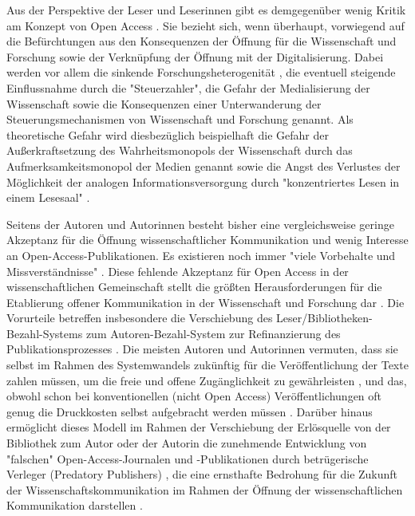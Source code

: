 Aus der Perspektive der Leser und Leserinnen gibt es demgegenüber wenig Kritik am Konzept von Open Access \cite{wein_2010_erwerbung} \cite{weishaupt_2009_goldenOA}. Sie bezieht sich, wenn überhaupt, vorwiegend auf die Befürchtungen aus den Konsequenzen der Öffnung für die Wissenschaft und Forschung sowie der Verknüpfung der Öffnung mit der Digitalisierung. Dabei werden vor allem die sinkende Forschungsheterogenität \cite{Hirschi_2015_buch_oa}, die eventuell steigende Einflussnahme durch die "Steuerzahler", die Gefahr der Medialisierung der Wissenschaft \cite{weingart_2005_wissenschaft} sowie die Konsequenzen einer Unterwanderung der Steuerungsmechanismen von Wissenschaft und Forschung genannt. Als theoretische Gefahr wird diesbezüglich beispielhaft die Gefahr der Außerkraftsetzung des Wahrheitsmonopols der Wissenschaft durch das Aufmerksamkeitsmonopol der Medien genannt \cite{weingart_2005_wissenschaft} sowie die Angst des Verlustes der Möglichkeit der analogen Informationsversorgung durch "konzentriertes Lesen in einem Lesesaal" \cite{winkler_2011_anforderungen}.

Seitens der Autoren und Autorinnen besteht bisher eine vergleichsweise geringe Akzeptanz für die Öffnung wissenschaftlicher Kommunikation und wenig Interesse an Open-Access-Publikationen. Es existieren noch immer "viele Vorbehalte und Missverständnisse" \cite{Suber_2002}. Diese fehlende Akzeptanz für Open Access in der wissenschaftlichen Gemeinschaft stellt die größten Herausforderungen für die Etablierung offener Kommunikation in der Wissenschaft und Forschung dar \cite{weishaupt_2009_goldenOA}. Die Vorurteile betreffen insbesondere die Verschiebung des Leser/Bibliotheken-Bezahl-Systems zum Autoren-Bezahl-System zur Refinanzierung des Publikationsprozesses \cite{EuropeanCommission_sciencepub_2006} \cite{Chibnik_2015}. Die meisten Autoren und Autorinnen vermuten, dass sie selbst im Rahmen des Systemwandels zukünftig für die Veröffentlichung der Texte zahlen müssen, um die freie und offene Zugänglichkeit zu gewährleisten \cite{Mussell_2013}, und das, obwohl schon bei konventionellen (nicht Open Access) Veröffentlichungen oft genug die Druckkosten selbst aufgebracht werden müssen \cite{weishaupt_2009_goldenOA}. Darüber hinaus ermöglicht dieses Modell im Rahmen der Verschiebung der Erlösquelle von der Bibliothek zum Autor oder der Autorin die zunehmende Entwicklung von "falschen" Open-Access-Journalen und -Publikationen durch betrügerische Verleger (Predatory Publishers) \cite{Beall_Predatory_2015}, die eine ernsthafte Bedrohung für die Zukunft der Wissenschaftskommunikation im Rahmen der Öffnung der wissenschaftlichen Kommunikation darstellen \cite{Beall_2012}.

